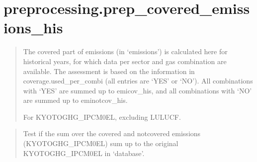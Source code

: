 \documentclass[letterpaper,10pt,english]{sphinxmanual}
\begin{document}


\chapter{preprocessing.prep\_covered\_emissions\_his}
\label{\detokenize{code:preprocessing-prep-covered-emissions-his}}
\begin{quote}

The covered part of emissions (in ‘emissions’) is calculated here for historical years,
for which data per sector and gas combination are available.
The assessment is based on the information in coverage.used\_per\_combi (all entries are ‘YES’ or ‘NO’).
All combinations with ‘YES’ are summed up to emicov\_his, and all combinations with ‘NO’ are summed up to eminotcov\_his.

For KYOTOGHG\_IPCM0EL, excluding LULUCF.
\end{quote}

\begin{quote}

Test if the sum over the covered and not\sphinxhyphen{}covered emissions (KYOTOGHG\_IPCM0EL)
sum up to the original KYOTOGHG\_IPCM0EL in ‘database’.
\end{quote}
\end{document}
